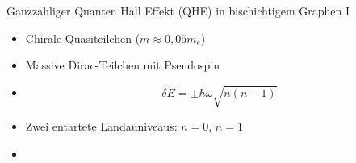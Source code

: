 \documentclass[../defence.tex]{subfiles}
\begin{document}
  \begin{frame}{Ganzzahliger Quanten Hall Effekt (QHE) in bischichtigem Graphen I}
      \begin{itemize}
        \item Chirale Quasiteilchen ($m\approx 0,05 m_e$)
        \item Massive Dirac-Teilchen mit Pseudospin
        \item \begin{equation*}
                \delta E = \pm \hbar \omega \sqrt{n(n-1)}
              \end{equation*}
        \item Zwei entartete Landauniveaus: $n=0$, $n=1$
        \item
      \end{itemize}
  \end{frame}
\end{document}
